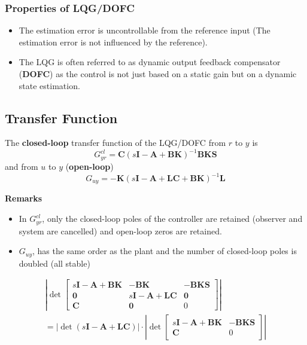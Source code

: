 \subsubsection{Properties of LQG/DOFC}

\begin{itemize}
    \item The estimation error is uncontrollable from the reference input (The estimation error is not influenced by the reference).
    \item The LQG is often referred to as dynamic output feedback compensator (\textbf{DOFC}) as the control is not just based on a static gain but on a dynamic state estimation.
\end{itemize}

\subsection{Transfer Function}
The \textbf{closed-loop} transfer function of the LQG/DOFC from $r$ to $y$ is
\begin{equation*}
    G_{yr}^{cl} = \mathbf{C}{(s\mathbf{I}-\mathbf{A}+\mathbf{BK})}^{-1}\mathbf{BKS}
\end{equation*}
and from $u$ to $y$ (\textbf{open-loop})
\begin{equation*}
    G_{uy} = -\mathbf{K}{(s\mathbf{I}-\mathbf{A}+\mathbf{LC}+\mathbf{BK})}^{-1}\mathbf{L}
\end{equation*}

\textbf{Remarks}
\begin{itemize}
    \item In $G_{yr}^{cl}$, only the closed-loop poles of the controller are retained (observer and system are cancelled) and open-loop zeros are retained.
    \item $G_{uy}$, has the same order as the plant and the number of closed-loop poles is doubled (all stable)
\end{itemize}


\begin{align*}
    \left.\left|\det\begin{bmatrix}s\mathbf{I}-\mathbf{A}+\mathbf{BK} & -\mathbf{BK}                       & -\mathbf{BKS} \\
               \mathbf{0}                         & s\mathbf{I}-\mathbf{A}+\mathbf{LC} & \mathbf{0}    \\
               \mathbf{C}                         & \mathbf{0}                         & 0\end{bmatrix}\right.\right| \\
    \left.=|\det(s\mathbf{I}-\mathbf{A}+\mathbf{LC})|\cdot\left|\det\begin{bmatrix}s\mathbf{I}-\mathbf{A}+\mathbf{BK} & -\mathbf{BKS} \\
               \mathbf{C}                         & 0\end{bmatrix}\right.\right|
\end{align*}

